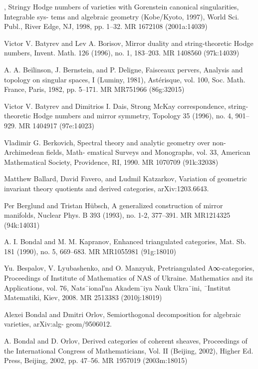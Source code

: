 {\begin{list}{}{%
  \setlength{\leftmargin}{3.4em}%
  \setlength{\itemindent}{-3.4em}%
  \setlength{\itemsep}{1.5pt}%
  \setlength{\parsep}{0pt}%
  \setlength{\listparindent}{0pt}%
}
\item[{[Bat98]}] , Stringy Hodge numbers of varieties with Gorenstein canonical singularities, Integrable sys- tems and algebraic geometry (Kobe/Kyoto, 1997), World Sci. Publ., River Edge, NJ, 1998, pp. 1--32. MR 1672108 (2001a:14039)
\item[{[BB96]}] Victor V. Batyrev and Lev A. Borisov, Mirror duality and string-theoretic Hodge numbers, Invent. Math. 126 (1996), no. 1, 183--203. MR 1408560 (97k:14039)
\item[{[BBD82]}] A. A. Beĭlinson, J. Bernstein, and P. Deligne, Faisceaux pervers, Analysis and topology on singular spaces, I (Luminy, 1981), Astérisque, vol. 100, Soc. Math. France, Paris, 1982, pp. 5--171. MR MR751966 (86g:32015)
\item[{[BD96]}] Victor V. Batyrev and Dimitrios I. Dais, Strong McKay correspondence, string-theoretic Hodge numbers and mirror symmetry, Topology 35 (1996), no. 4, 901--929. MR 1404917 (97e:14023)
\item[{[Ber90]}] Vladimir G. Berkovich, Spectral theory and analytic geometry over non-Archimedean fields, Math- ematical Surveys and Monographs, vol. 33, American Mathematical Society, Providence, RI, 1990. MR 1070709 (91k:32038)
\item[{[BFK]}] Matthew Ballard, David Favero, and Ludmil Katzarkov, Variation of geometric invariant theory quotients and derived categories, arXiv:1203.6643.
\item[{[BH93]}] Per Berglund and Tristan Hübsch, A generalized construction of mirror manifolds, Nuclear Phys. B 393 (1993), no. 1-2, 377--391. MR MR1214325 (94k:14031)
\item[{[BK90]}] A. I. Bondal and M. M. Kapranov, Enhanced triangulated categories, Mat. Sb. 181 (1990), no. 5, 669--683. MR MR1055981 (91g:18010)
\item[{[BLM08]}] Yu. Bespalov, V. Lyubashenko, and O. Manzyuk, Pretriangulated A∞-categories, Proceedings of Institute of Mathematics of NAS of Ukraine. Mathematics and its Applications, vol. 76, Nats¯ional′na Akadem¯iya Nauk Ukra¨ini, ¯Institut Matematiki, Kiev, 2008. MR 2513383 (2010j:18019)
\item[{[BO]}] Alexei Bondal and Dmitri Orlov, Semiorthogonal decomposition for algebraic varieties, arXiv:alg- geom/9506012.
\item[{[BO02]}] A. Bondal and D. Orlov, Derived categories of coherent sheaves, Proceedings of the International Congress of Mathematicians, Vol. II (Beijing, 2002), Higher Ed. Press, Beijing, 2002, pp. 47--56. MR 1957019 (2003m:18015)

\end{list}}

